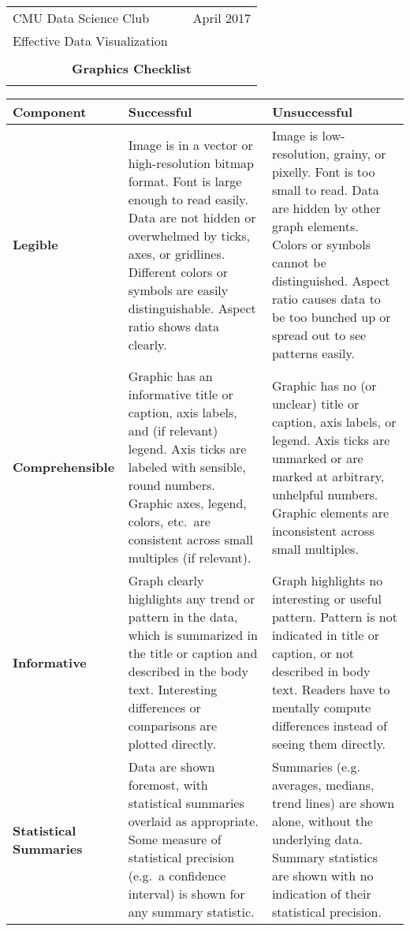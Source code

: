 \documentclass[12pt]{article}
\begin{document}
\begin{table}\centering
\begin{tabular*}{6.5in}{@{\extracolsep{\fill}}|llr|} \hline
CMU Data Science Club & \hspace*{0.5 in} & April 2017 \\
Effective Data Visualization & &  \\
 & & \\
\multicolumn{3}{|c|}{
{{\large {\bf Graphics Checklist}}}} \\
 & & \\ \hline
\end{tabular*}
\end{table}

\begin{table}[h!]
\begin{tabular}{>{\raggedright}p{1.4in}p{2.3in}p{2.3in}}
\textbf{Component} & \textbf{Successful} & \textbf{Unsuccessful}\\ \hline
\textbf{Legible} & Image is in a vector or high-resolution bitmap format. Font is large enough to read easily. Data are not hidden or overwhelmed by ticks, axes, or gridlines. Different colors or symbols are easily distinguishable. Aspect ratio shows data clearly. & Image is low-resolution, grainy, or pixelly. Font is too small to read. Data are hidden by other graph elements. Colors or symbols cannot be distinguished. Aspect ratio causes data to be too bunched up or spread out to see patterns easily.\\ \hline
\textbf{Comprehensible} & Graphic has an informative title or caption, axis labels, and (if relevant) legend. Axis ticks are labeled with sensible, round numbers. Graphic axes, legend, colors, etc.\ are consistent across small multiples (if relevant). & Graphic has no (or unclear) title or caption, axis labels, or legend. Axis ticks are unmarked or are marked at arbitrary, unhelpful numbers. Graphic elements are inconsistent across small multiples. \\ \hline
\textbf{Informative} & Graph clearly highlights any trend or pattern in the data, which is summarized in the title or caption and described in the body text. Interesting differences or comparisons are plotted directly. & Graph highlights no interesting or useful pattern. Pattern is not indicated in title or caption, or not described in body text. Readers have to mentally compute differences instead of seeing them directly.\\ \hline
\textbf{Statistical Summaries} & Data are shown foremost, with statistical summaries overlaid as appropriate. Some measure of statistical precision (e.g.\ a confidence interval) is shown for any summary statistic. & Summaries (e.g. averages, medians, trend lines) are shown alone, without the underlying data. Summary statistics are shown with no indication of their statistical precision.\\ \hline
\end{tabular}
\end{table}
\end{document}
